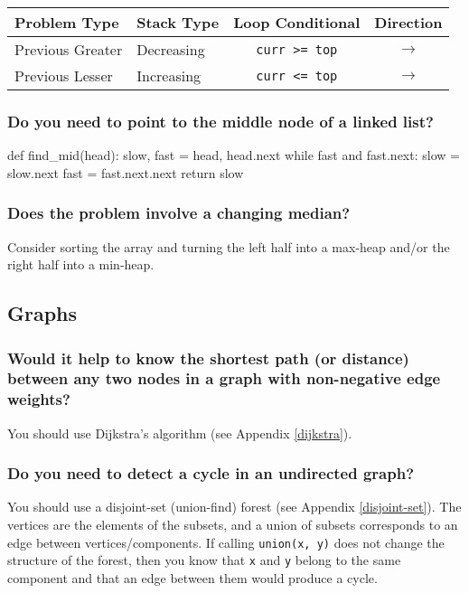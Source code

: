 \documentclass[12pt, titlepage]{article}
\begin{document}
\begin{center}
\begin{tabular}{|l|l|c|c|}
  \hline
  Problem Type & Stack Type & Loop Conditional & Direction \\
  \hline
  Previous Greater & Decreasing & \texttt{curr >= top} & $\rightarrow$ \\
  Previous Lesser & Increasing & \texttt{curr <= top} & $\rightarrow$ \\
  \hline
\end{tabular}
\end{center} \bigskip

\subsubsection{Do you need to point to the middle node of a linked list?}

\begin{python}
def find_mid(head):
    slow, fast = head, head.next
    while fast and fast.next:
        slow = slow.next
        fast = fast.next.next
    return slow
\end{python}

\subsubsection{Does the problem involve a changing median?}

Consider sorting the array and turning the left half into a max-heap and/or the right half into a min-heap.

\subsection{Graphs}

\subsubsection{Would it help to know the shortest path (or distance) between any two nodes in a graph with non-negative edge weights?}

You should use Dijkstra's algorithm (see Appendix \ref{dijkstra}).

\subsubsection{Do you need to detect a cycle in an undirected graph?}

You should use a disjoint-set (union-find) forest (see Appendix \ref{disjoint-set}). The vertices are the elements of the subsets, and a union of subsets corresponds to an edge between vertices/components. If calling \texttt{union(x, y)} does not change the structure of the forest, then you know that \texttt{x} and \texttt{y} belong to the same component and that an edge between them would produce a cycle.
\end{document}
